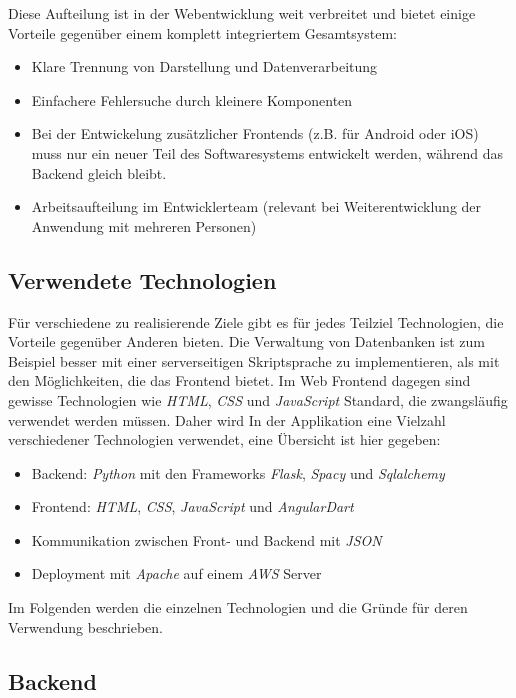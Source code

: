Diese Aufteilung ist in der Webentwicklung weit verbreitet\cite{Fielding:2000:ASD:932295} und bietet einige Vorteile gegenüber einem komplett integriertem Gesamtsystem:

\begin{itemize}
	\item Klare Trennung von Darstellung und Datenverarbeitung
	\item Einfachere Fehlersuche durch kleinere Komponenten
	\item Bei der Entwickelung zusätzlicher Frontends (z.B. für Android oder iOS) muss nur ein neuer Teil des Softwaresystems entwickelt werden, während das Backend gleich bleibt.
	\item Arbeitsaufteilung im Entwicklerteam (relevant bei Weiterentwicklung der Anwendung mit mehreren Personen)
\end{itemize}

\subsection{Verwendete Technologien}
Für verschiedene zu realisierende Ziele gibt es für jedes Teilziel Technologien, die Vorteile gegenüber Anderen bieten. Die Verwaltung von Datenbanken ist zum Beispiel besser mit einer serverseitigen Skriptsprache zu implementieren, als mit den Möglichkeiten, die das Frontend bietet. Im Web Frontend dagegen sind gewisse Technologien wie \textit{HTML}, \textit{CSS} und \textit{JavaScript} Standard, die zwangsläufig verwendet werden müssen. Daher wird In der Applikation eine Vielzahl verschiedener Technologien verwendet, eine Übersicht ist hier gegeben:

\begin{itemize}
	\item Backend: \textit{Python} mit den Frameworks \textit{Flask}, \textit{Spacy} und \textit{Sqlalchemy}
	\item Frontend: \textit{HTML}, \textit{CSS}, \textit{JavaScript} und \textit{AngularDart}
	\item Kommunikation zwischen Front- und Backend mit \textit{JSON}
	\item Deployment mit \textit{Apache} auf einem \textit{AWS} Server
\end{itemize}

Im Folgenden werden die einzelnen Technologien und die Gründe für deren Verwendung beschrieben.

\subsection{Backend}
\label{sec:backend}

